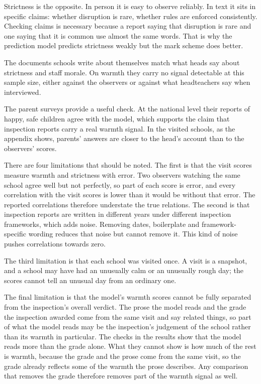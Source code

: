 Strictness is the opposite. In person it is easy to observe reliably. In text it sits in specific
claims: whether disruption is rare, whether rules are enforced consistently. Checking claims is necessary
because a report saying that disruption is rare and one saying that it is common use
almost the same words. That is why the prediction model predicts strictness weakly but the mark scheme does better.

The documents schools write about themselves match what heads say about strictness and staff morale. On warmth they carry no signal detectable at this sample size, either against the
observers or against what headteachers say when interviewed.

The parent surveys provide a useful check. At the national level their reports of happy, safe children
agree with the model, which supports the claim that inspection reports carry a real warmth signal.
In the visited schools, as the appendix shows, parents' answers are closer to the head's account than to the observers' scores.

There are four limitations that should be noted. The first is that the visit scores measure
warmth and strictness with error. Two observers watching the same school agree well but not
perfectly, so part of each score is error, and every correlation with the visit scores is lower than it would be without that error. The reported correlations therefore understate the true relations. The second is that inspection reports are written in different years under
different inspection frameworks, which adds noise. Removing dates, boilerplate and framework-specific wording reduces that noise but cannot remove it.
This kind of noise pushes correlations towards zero.

The third limitation is that each school was visited once. A visit is a
snapshot, and a school may have had an unusually calm or an unusually rough day; the scores
cannot tell an unusual day from an ordinary one.

The final limitation is that the model's warmth scores cannot be fully separated from the inspection's overall verdict. The prose
the model reads and the grade the inspection awarded come from the same visit and say
related things, so part of what the model reads may be the inspection's judgement of the
school rather than its warmth in particular. The checks in the results show that the model
reads more than the grade alone. What they cannot show is how much of the rest is warmth,
because the grade and the prose come from the same visit, so the grade already reflects some of the warmth the prose describes. Any comparison that removes the grade therefore removes part of the warmth signal as well.

